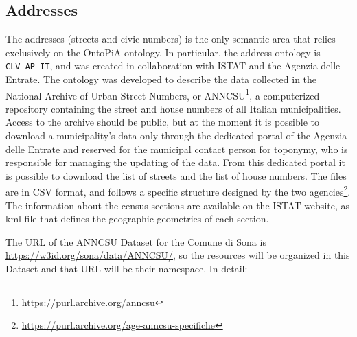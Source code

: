 \subsection{Addresses}
\label{subsec:addresses-data}

The addresses (streets and civic numbers) is the only semantic area that relies exclusively on the OntoPiA ontology. In particular, the address ontology is \verb#CLV_AP-IT#, and was created in collaboration with ISTAT and the Agenzia delle Entrate. The ontology was developed to describe the data collected in the National Archive of Urban Street Numbers, or ANNCSU\footnote{\url{https://purl.archive.org/anncsu}}, a computerized repository containing the street and house numbers of all Italian municipalities. Access to the archive should be public, but at the moment it is possible to download a municipality's data only through the dedicated portal of the Agenzia delle Entrate and reserved for the municipal contact person for toponymy, who is responsible for managing the updating of the data. From this dedicated portal it is possible to download the list of streets and the list of house numbers. The files are in \ac{CSV} format, and follows a specific structure designed by the two agencies\footnote{\url{https://purl.archive.org/age-anncsu-specifiche}}. The information about the census sections are available on the ISTAT website, as kml file that defines the geographic geometries of each section.

The \ac{URL} of the ANNCSU Dataset for the Comune di Sona is \url{https://w3id.org/sona/data/ANNCSU/}, so the resources will be organized in this Dataset and that \ac{URL} will be their namespace. In detail:

